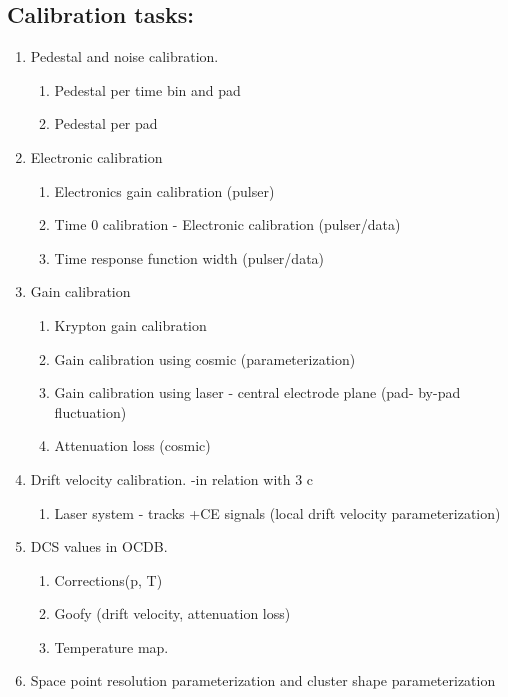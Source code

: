 \documentclass[a4paper,12pt]{article}
\begin{document}
\subsection{Calibration tasks:}
\renewcommand{\theenumi}{\arabic{enumi}}
\renewcommand{\labelenumi}{\theenumi.}
\renewcommand{\theenumii}{\alph{enumii}}
\renewcommand{\labelenumii}{\theenumii.}
\begin{enumerate}
 \item Pedestal and noise calibration. 
 \begin{enumerate} 
   \item Pedestal per time bin and pad
   \item Pedestal per pad
 \end{enumerate}
 \item[] Electronic calibration
 \begin{enumerate} 
   \addtocounter{enumii}{2}
   \item Electronics gain calibration (pulser)
   \item Time 0 calibration - Electronic calibration (pulser/data)
   \item Time response function width (pulser/data)
 \end{enumerate}
 \item Gain calibration
 \begin{enumerate} 
   \item Krypton gain calibration
   \item Gain calibration using cosmic (parameterization)
   \item Gain calibration using laser - central electrode plane (pad- by-pad  fluctuation)
   \item Attenuation loss (cosmic)
 \end{enumerate}
 \item Drift velocity calibration. -in relation with 3 c
 \begin{enumerate} 
   \item Laser system - tracks +CE signals (local drift velocity parameterization)
 \end{enumerate}
 \item DCS values in OCDB.
 \begin{enumerate} 
    \item Corrections(p, T)
    \item Goofy (drift velocity, attenuation loss)
    \item Temperature map.
 \end{enumerate}
 \item Space point resolution parameterization and cluster shape parameterization

\end{enumerate}
\end{document}
